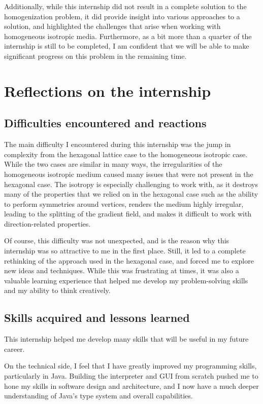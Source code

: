 \documentclass[11pt,a4paper]{report}
\begin{document}
Additionally, while this internship did not result in a complete solution to the homogenization problem, it did provide insight into various approaches to a solution, and highlighted the challenges that arise when working with homogeneous isotropic media. Furthermore, as a bit more than a quarter of the internship is still to be completed, I am confident that we will be able to make significant progress on this problem in the remaining time.

\section{Reflections on the internship}

\subsection{Difficulties encountered and reactions}

The main difficulty I encountered during this internship was the jump in complexity from the hexagonal lattice case to the homogeneous isotropic case. While the two cases are similar in many ways, the irregularities of the homogeneous isotropic medium caused many issues that were not present in the hexagonal case. The isotropy is especially challenging to work with, as it destroys many of the properties that we relied on in the hexagonal case such as the ability to perform symmetries around vertices, renders the medium highly irregular, leading to the splitting of the gradient field, and makes it difficult to work with direction-related properties.

Of course, this difficulty was not unexpected, and is the reason why this internship was so attractive to me in the first place. Still, it led to a complete rethinking of the approach used in the hexagonal case, and forced me to explore new ideas and techniques. While this was frustrating at times, it was also a valuable learning experience that helped me develop my problem-solving skills and my ability to think creatively.

\subsection{Skills acquired and lessons learned}

This internship helped me develop many skills that will be useful in my future career.

On the technical side, I feel that I have greatly improved my programming skills, particularly in Java. Building the interpreter and GUI from scratch pushed me to hone my skills in software design and architecture, and I now have a much deeper understanding of Java's type system and overall capabilities.
\end{document}
